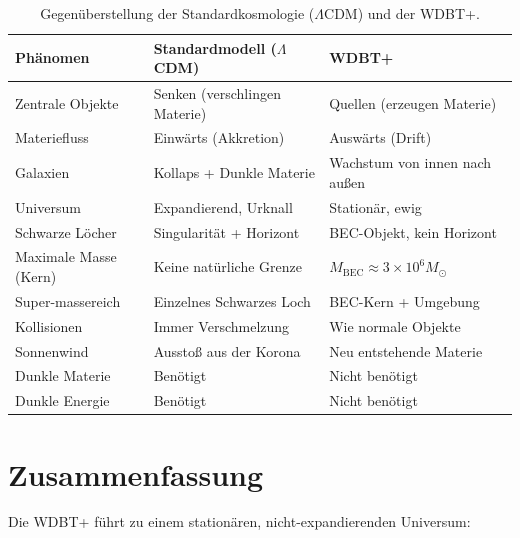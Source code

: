 \begin{table}[htbp]
\centering
\caption{Gegenüberstellung der Standardkosmologie (\(\Lambda\)CDM) und der WDBT+.}
\begin{tabular}{lp{4.5cm}p{4.5cm}}
\hline
\textbf{Phänomen} & \textbf{Standardmodell (\(\Lambda\)CDM)} & \textbf{WDBT+} \\
\hline
Zentrale Objekte & Senken (verschlingen Materie) & Quellen (erzeugen Materie) \\
Materiefluss & Einwärts (Akkretion) & Auswärts (Drift) \\
Galaxien & Kollaps + Dunkle Materie & Wachstum von innen nach außen \\
Universum & Expandierend, Urknall & Stationär, ewig \\
Schwarze Löcher & Singularität + Horizont & BEC-Objekt, kein Horizont \\
Maximale Masse (Kern) & Keine natürliche Grenze & \( M_{\text{BEC}} \approx 3 \times 10^6 M_{\odot} \) \\
Super-massereich & Einzelnes Schwarzes Loch & BEC-Kern + Umgebung \\
Kollisionen & Immer Verschmelzung & Wie normale Objekte \\
Sonnenwind & Ausstoß aus der Korona & Neu entstehende Materie \\
Dunkle Materie & Benötigt & Nicht benötigt \\
Dunkle Energie & Benötigt & Nicht benötigt \\
\hline
\end{tabular}
\label{tab:kosmo_vergleich}
\end{table}

\section{Zusammenfassung}
\label{sec:kosmo_zusammenfassung}

Die WDBT+ führt zu einem stationären, nicht-expandierenden Universum:

